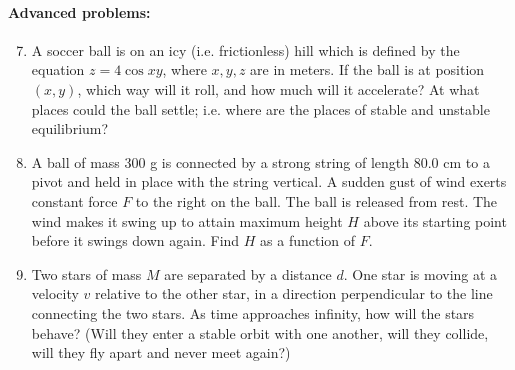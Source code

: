 \documentclass[12pt,letterpaper]{article}
\begin{document}
\paragraph{Advanced problems:}
\begin{enumerate}
\setcounter{enumi}{6}
\item
A soccer ball is on an icy (i.e. frictionless) hill which is defined by the equation ${z = 4\cos xy}$, where $x, y, z$ are in meters. If the ball is at position $(x, y)$, which way will it roll, and how much will it accelerate? At what places could the ball settle; i.e. where are the places of stable and unstable equilibrium? 

\item
A ball of mass 300 g is connected by a strong string of length 80.0 cm to a pivot and held in place with the string vertical. A sudden gust of wind exerts constant force $F$ to the right on the ball. The ball is released from rest. The wind makes it swing up to attain maximum height $H$ above its starting point before it swings down again. Find $H$ as a function of $F$.

\item
Two stars of mass $M$ are separated by a distance $d$. One star is moving at a velocity $v$ relative to the other star, in a direction perpendicular to the line connecting the two stars. As time approaches infinity, how will the stars behave? (Will they enter a stable orbit with one another, will they collide, will they fly apart and never meet again?)
\end{enumerate}
\end{document}
